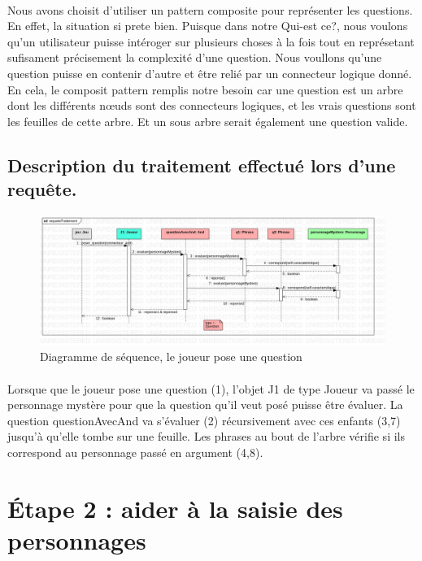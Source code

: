 \documentclass[a4paper]{article}
\begin{document}
 \paragraph*{}
 Nous avons choisit d'utiliser un pattern composite pour représenter les questions.
 En effet, la situation si prete bien. Puisque dans notre Qui-est ce?, nous voulons qu'un utilisateur puisse intéroger sur plusieurs choses à la fois tout en représetant sufisament précisement la complexité d'une question.
 Nous voullons qu'une question puisse en contenir d'autre et être relié par un connecteur logique donné.
 En cela, le composit pattern remplis notre besoin car une question est un arbre dont les différents nœuds sont des connecteurs logiques, et les vrais questions sont les feuilles de cette arbre. Et un sous arbre serait également une question valide.
 
 
 \subsection*{Description du traitement effectué lors d'une requête.}
 \begin{figure}
   \caption{Diagramme de séquence, le joueur pose une question}
   \centering
   \includegraphics[scale=0.38]{./requeteTraitement.jpg}
 \end{figure}
 
 \paragraph*{}Lorsque que le joueur pose une question (1), l'objet J1 de type Joueur va passé le personnage mystère pour que la question qu'il veut posé puisse être évaluer.
 La question questionAvecAnd va s'évaluer (2) récursivement avec ces enfants (3,7) jusqu'à qu'elle tombe sur une feuille. Les phrases au bout de l'arbre vérifie si ils correspond au personnage passé en argument (4,8).
 \clearpage

 \section{Étape 2 : aider  à la saisie  des personnages}
\end{document}
